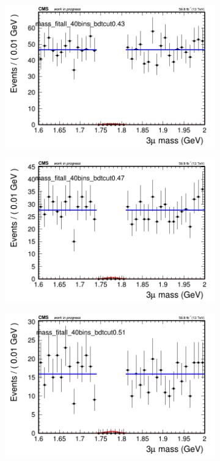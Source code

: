 \begin{figure}[H]
\begin{subfigure}{0.2\textwidth}
        \caption{}
    \end{subfigure}
    \begin{subfigure}{0.2\textwidth}
        \includegraphics[width=\textwidth]{flat_fit/plots/all/massfit_all_40bins_bdtcut0.43.png}
        \caption{}
    \end{subfigure}
    \begin{subfigure}{0.2\textwidth}
        \includegraphics[width=\textwidth]{flat_fit/plots/all/massfit_all_40bins_bdtcut0.47.png}
        \caption{}
    \end{subfigure}
    \begin{subfigure}{0.2\textwidth}
        \includegraphics[width=\textwidth]{flat_fit/plots/all/massfit_all_40bins_bdtcut0.51.png}

\end{subfigure}
\end{figure}
